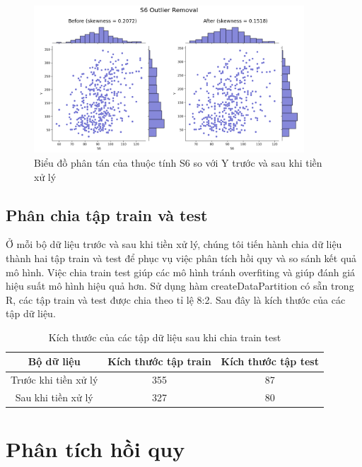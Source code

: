 \documentclass[runningheads]{llncs}
\begin{document}
\begin{figure}[H]
\centering
\includegraphics[width=0.9\textwidth]{S6OR}
\caption{Biểu đồ phân tán của thuộc tính S6 so với Y trước và sau khi tiền xử lý} \label{fig2}
\end{figure}

\subsection{Phân chia tập train và test}

Ở mỗi bộ dữ liệu trước và sau khi tiền xử lý, chúng tôi tiến hành chia dữ liệu thành hai tập train và test để phục vụ việc phân tích hồi quy và so sánh kết quả mô hình. Việc chia train test giúp các mô hình tránh overfiting và giúp đánh giá hiệu suất mô hình hiệu quả hơn. Sử dụng hàm createDataPartition có sẵn trong R, các tập train và test được chia theo tỉ lệ 8:2. Sau đây là kích thước của các tập dữ liệu.

\begin{table}
	\setlength{\tabcolsep}{0.5em}
	\renewcommand{\arraystretch}{1.4}
	\begin{center}
		\caption{Kích thước của các tập dữ liệu sau khi chia train test}\label{tab3}
		\begin{tabular}{|c|c|c|}
			\hline
			Bộ dữ liệu&Kích thước tập train&Kích thước tập test\\
			\hline
			Trước khi tiền xử lý&355&87\\
			\hline
			Sau khi tiền xử lý&327&80\\
			\hline
		\end{tabular}			
	\end{center}
\end{table}

\section{Phân tích hồi quy}
\end{document}
